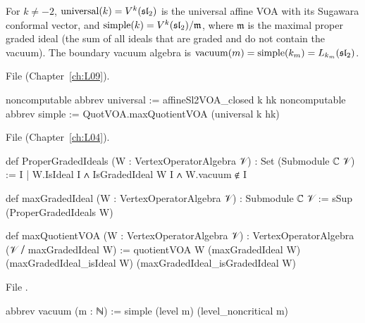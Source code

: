 \begin{definition}\label{l20:def:simple}
For $k\neq-2$, $\mathrm{universal}(k)=V^k(\mathfrak{sl}_2)$ is the universal affine VOA with its Sugawara conformal
vector, and $\mathrm{simple}(k)=V^k(\mathfrak{sl}_2)/\mathfrak m$, where $\mathfrak m$ is the maximal proper graded
ideal (the sum of all ideals that are graded and do not contain the vacuum). The boundary vacuum algebra is
$\mathrm{vacuum}(m)=\mathrm{simple}(k_m)=L_{k_m}(\mathfrak{sl}_2)$.
\end{definition}
\noindent File  (Chapter~\ref{ch:L09}).
\begin{leancode}
noncomputable abbrev universal := affineSl2VOA_closed k hk
noncomputable abbrev simple := QuotVOA.maxQuotientVOA (universal k hk)
\end{leancode}
\noindent File  (Chapter~\ref{ch:L04}).
\begin{leancode}
def ProperGradedIdeals (W : VertexOperatorAlgebra 𝒱) : Set (Submodule ℂ 𝒱) :=
  {I | W.IsIdeal I ∧ IsGradedIdeal W I ∧ W.vacuum ∉ I}

def maxGradedIdeal (W : VertexOperatorAlgebra 𝒱) : Submodule ℂ 𝒱 :=
  sSup (ProperGradedIdeals W)

def maxQuotientVOA (W : VertexOperatorAlgebra 𝒱) :
    VertexOperatorAlgebra (𝒱 ⧸ maxGradedIdeal W) :=
  quotientVOA W (maxGradedIdeal W) (maxGradedIdeal_isIdeal W) (maxGradedIdeal_isGradedIdeal W)
\end{leancode}
\noindent File .
\begin{leancode}
abbrev vacuum (m : ℕ) := simple (level m) (level_noncritical m)
\end{leancode}

